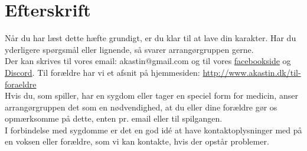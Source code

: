 \chapter{Efterskrift}
Når du har læst dette hæfte grundigt, er du klar til at lave din karakter. Har du yderligere spørgsmål eller lignende, så svarer arrangørgruppen gerne.\\
Der kan skrives til vores email: akastin@gmail.com
og til vores \href{https://www.facebook.com/groups/105480345934/?fref=nf}{facebookside} og \href{https://discord.gg/3Ykbtag}{Discord}. 
Til forældre har vi et afsnit på hjemmesiden: \url{http://www.akastin.dk/til-foraeldre}\\
Hvis du, som spiller, har en sygdom eller tager en speciel form for medicin, anser arrangørgruppen det som en nødvendighed, at du eller dine forældre gør os opmærksomme på dette, enten pr. email eller til spilgangen.\\
I forbindelse med sygdomme er det en god idé at have kontaktoplysninger med på en voksen eller forældre, som vi kan kontakte, hvis der opstår problemer. 